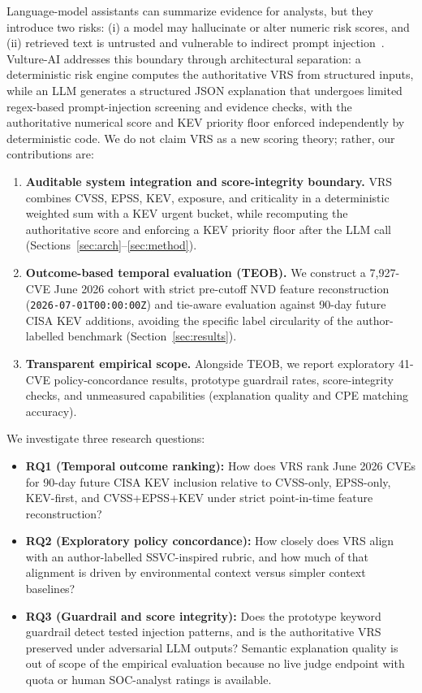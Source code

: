 \documentclass[conference]{IEEEtran}
\begin{document}
Language-model assistants can summarize evidence for analysts, but they introduce two risks: (i) a model may hallucinate or alter numeric risk scores, and (ii) retrieved text is untrusted and vulnerable to indirect prompt injection~\cite{greshake2023indirect}. Vulture-AI addresses this boundary through architectural separation: a deterministic risk engine computes the authoritative VRS from structured inputs, while an LLM generates a structured JSON explanation that undergoes limited regex-based prompt-injection screening and evidence checks, with the authoritative numerical score and KEV priority floor enforced independently by deterministic code. We do not claim VRS as a new scoring theory; rather, our contributions are:
\begin{enumerate}
    \item \textbf{Auditable system integration and score-integrity boundary.} VRS combines CVSS, EPSS, KEV, exposure, and criticality in a deterministic weighted sum with a KEV urgent bucket, while recomputing the authoritative score and enforcing a KEV priority floor after the LLM call (Sections~\ref{sec:arch}--\ref{sec:method}).
    \item \textbf{Outcome-based temporal evaluation (TEOB).} We construct a 7,927-CVE June 2026 cohort with strict pre-cutoff NVD feature reconstruction (\texttt{2026-07-01T00:00:00Z}) and tie-aware evaluation against 90-day future CISA KEV additions, avoiding the specific label circularity of the author-labelled benchmark (Section~\ref{sec:results}).
    \item \textbf{Transparent empirical scope.} Alongside TEOB, we report exploratory 41-CVE policy-concordance results, prototype guardrail rates, score-integrity checks, and unmeasured capabilities (explanation quality and CPE matching accuracy).
\end{enumerate}

We investigate three research questions:
\begin{itemize}
    \item \textbf{RQ1 (Temporal outcome ranking):} How does VRS rank June 2026 CVEs for 90-day future CISA KEV inclusion relative to CVSS-only, EPSS-only, KEV-first, and CVSS+EPSS+KEV under strict point-in-time feature reconstruction?
    \item \textbf{RQ2 (Exploratory policy concordance):} How closely does VRS align with an author-labelled SSVC-inspired rubric, and how much of that alignment is driven by environmental context versus simpler context baselines?
    \item \textbf{RQ3 (Guardrail and score integrity):} Does the prototype keyword guardrail detect tested injection patterns, and is the authoritative VRS preserved under adversarial LLM outputs? Semantic explanation quality is out of scope of the empirical evaluation because no live judge endpoint with quota or human SOC-analyst ratings is available.
\end{itemize}
\end{document}
